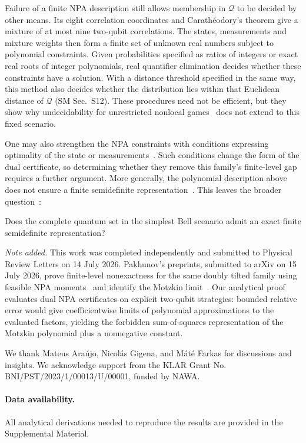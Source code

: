 \documentclass[aps,prl,twocolumn,10pt,superscriptaddress,nofootinbib,longbibliography,nobalancelastpage]{revtex4-2}
\newcommand{\Q}{\mathcal Q}
\begin{document}
Failure of a finite NPA description still allows membership in $\Q$ to be decided by other means. Its eight correlation coordinates and Carathéodory's theorem give a mixture of at most nine two-qubit correlations. The states, measurements and mixture weights then form a finite set of unknown real numbers subject to polynomial constraints. Given probabilities specified as ratios of integers or exact real roots of integer polynomials, real quantifier elimination decides whether these constraints have a solution. With a distance threshold specified in the same way, this method also decides whether the distribution lies within that Euclidean distance of $\Q$ (SM Sec.~S12). These procedures need not be efficient, but they show why undecidability for unrestricted nonlocal games~\cite{MIPstarRE} does not extend to this fixed scenario.

One may also strengthen the NPA constraints with conditions expressing optimality of the state or measurements~\cite{AraujoEtAl2026}. Such conditions change the form of the dual certificate, so determining whether they remove this family's finite-level gap requires a further argument. More generally, the polynomial description above does not ensure a finite semidefinite representation~\cite{Scheiderer2018}. This leaves the broader question~\cite{FarkasQLunch2026}:

Does the complete quantum set in the simplest Bell scenario admit an exact finite semidefinite representation?

\emph{Note added.} This work was completed independently and submitted to Physical Review Letters on 14 July 2026. Pakhunov's preprints, submitted to arXiv on 15 July 2026, prove finite-level nonexactness for the same doubly tilted family using feasible NPA moments~\cite{Pakhunov2026a} and identify the Motzkin limit~\cite{Pakhunov2026b}. Our analytical proof evaluates dual NPA certificates on explicit two-qubit strategies: bounded relative error would give coefficientwise limits of polynomial approximations to the evaluated factors, yielding the forbidden sum-of-squares representation of the Motzkin polynomial plus a nonnegative constant.

\begin{acknowledgments}
We thank Mateus Ara\'ujo, Nicol\'as Gigena, and M\'at\'e Farkas for discussions and insights.
We acknowledge support from the KLAR Grant No. BNI/PST/2023/1/00013/U/00001, funded by NAWA.
\end{acknowledgments}
\paragraph*{Data availability.}
All analytical derivations needed to reproduce the results are provided in the Supplemental Material.

\end{document}
